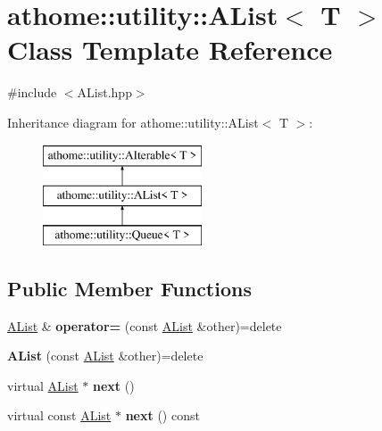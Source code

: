 \hypertarget{classathome_1_1utility_1_1_a_list}{}\section{athome\+:\+:utility\+:\+:A\+List$<$ T $>$ Class Template Reference}
\label{classathome_1_1utility_1_1_a_list}


{\ttfamily \#include $<$A\+List.\+hpp$>$}

Inheritance diagram for athome\+:\+:utility\+:\+:A\+List$<$ T $>$\+:\begin{figure}[H]
\begin{center}
\leavevmode
\includegraphics[height=3.000000cm]{classathome_1_1utility_1_1_a_list}
\end{center}
\end{figure}
\subsection*{Public Member Functions}
\begin{DoxyCompactItemize}
\item 
\mbox{\label{classathome_1_1utility_1_1_a_list_a4357e5fb8b5df413fd06e1eb6aa49cb3}} 
\mbox{\hyperlink{classathome_1_1utility_1_1_a_list}{A\+List}} \& {\bfseries operator=} (const \mbox{\hyperlink{classathome_1_1utility_1_1_a_list}{A\+List}} \&other)=delete
\item 
\mbox{\label{classathome_1_1utility_1_1_a_list_ab79aa1dcfeca6e6aca24f57c777a8465}} 
{\bfseries A\+List} (const \mbox{\hyperlink{classathome_1_1utility_1_1_a_list}{A\+List}} \&other)=delete
\item 
\mbox{\label{classathome_1_1utility_1_1_a_list_ac6617186aba891c8667ef294680ac5a1}} 
virtual \mbox{\hyperlink{classathome_1_1utility_1_1_a_list}{A\+List}} $\ast$ {\bfseries next} ()
\item 
\mbox{\label{classathome_1_1utility_1_1_a_list_a6444408a1d6b935de431330c960686af}} 
virtual const \mbox{\hyperlink{classathome_1_1utility_1_1_a_list}{A\+List}} $\ast$ {\bfseries next} () const
\end{DoxyCompactItemize}
